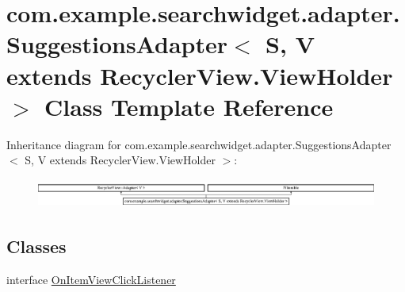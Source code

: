 \hypertarget{classcom_1_1example_1_1searchwidget_1_1adapter_1_1_suggestions_adapter}{}\section{com.\+example.\+searchwidget.\+adapter.\+Suggestions\+Adapter$<$ S, V extends Recycler\+View.\+View\+Holder $>$ Class Template Reference}
\label{classcom_1_1example_1_1searchwidget_1_1adapter_1_1_suggestions_adapter}
Inheritance diagram for com.\+example.\+searchwidget.\+adapter.\+Suggestions\+Adapter$<$ S, V extends Recycler\+View.\+View\+Holder $>$\+:\begin{figure}[H]
\begin{center}
\leavevmode
\includegraphics[height=0.952381cm]{classcom_1_1example_1_1searchwidget_1_1adapter_1_1_suggestions_adapter}
\end{center}
\end{figure}
\subsection*{Classes}
\begin{DoxyCompactItemize}
\item 
interface \mbox{\hyperlink{interfacecom_1_1example_1_1searchwidget_1_1adapter_1_1_suggestions_adapter_1_1_on_item_view_click_listener}{On\+Item\+View\+Click\+Listener}}
\end{DoxyCompactItemize}
